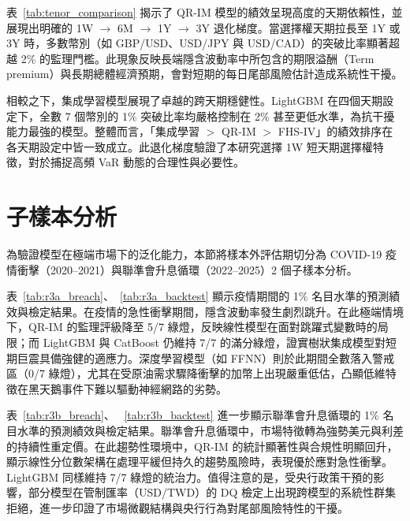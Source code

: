 
表~\ref{tab:tenor_comparison} 揭示了 QR-IM 模型的績效呈現高度的天期依賴性，並展現出明確的 1W $\to$ 6M $\to$ 1Y $\to$ 3Y 退化梯度。當選擇權天期拉長至 1Y 或 3Y 時，多數幣別（如 GBP/USD、USD/JPY 與 USD/CAD）的突破比率顯著超越 2\% 的監理門檻。此現象反映長端隱含波動率中所包含的期限溢酬（Term premium）與長期總體經濟預期，會對短期的每日尾部風險估計造成系統性干擾。

相較之下，集成學習模型展現了卓越的跨天期穩健性。LightGBM 在四個天期設定下，全數 7 個幣別的 1\% 突破比率均嚴格控制在 2\% 甚至更低水準，為抗干擾能力最強的模型。整體而言，「集成學習 $>$ QR-IM $>$ FHS-IV」的績效排序在各天期設定中皆一致成立。此退化梯度驗證了本研究選擇 1W 短天期選擇權特徵，對於捕捉高頻 VaR 動態的合理性與必要性。

\section{子樣本分析}
\label{sec:r_subsample}

為驗證模型在極端市場下的泛化能力，本節將樣本外評估期切分為 COVID-19 疫情衝擊（2020–2021）與聯準會升息循環（2022–2025）2 個子樣本分析。

表~\ref{tab:r3a_breach}、~\ref{tab:r3a_backtest} 顯示疫情期間的 1\% 名目水準的預測績效與檢定結果。在疫情的急性衝擊期間，隱含波動率發生劇烈跳升。在此極端情境下，QR-IM 的監理評級降至 5/7 綠燈，反映線性模型在面對跳躍式變數時的局限；而 LightGBM 與 CatBoost 仍維持 7/7 的滿分綠燈，證實樹狀集成模型對短期巨震具備強健的適應力。深度學習模型（如 FFNN）則於此期間全數落入警戒區（0/7 綠燈），尤其在受原油需求驟降衝擊的加幣上出現嚴重低估，凸顯低維特徵在黑天鵝事件下難以驅動神經網路的劣勢。

表~\ref{tab:r3b_breach}、 ~\ref{tab:r3b_backtest} 進一步顯示聯準會升息循環的 1\% 名目水準的預測績效與檢定結果。聯準會升息循環中，市場特徵轉為強勢美元與利差的持續性重定價。在此趨勢性環境中，QR-IM 的統計顯著性與合規性明顯回升，顯示線性分位數架構在處理平緩但持久的趨勢風險時，表現優於應對急性衝擊。LightGBM 同樣維持 7/7 綠燈的統治力。值得注意的是，受央行政策干預的影響，部分模型在管制匯率（USD/TWD）的 DQ 檢定上出現跨模型的系統性群集拒絕，進一步印證了市場微觀結構與央行行為對尾部風險特性的干擾。

